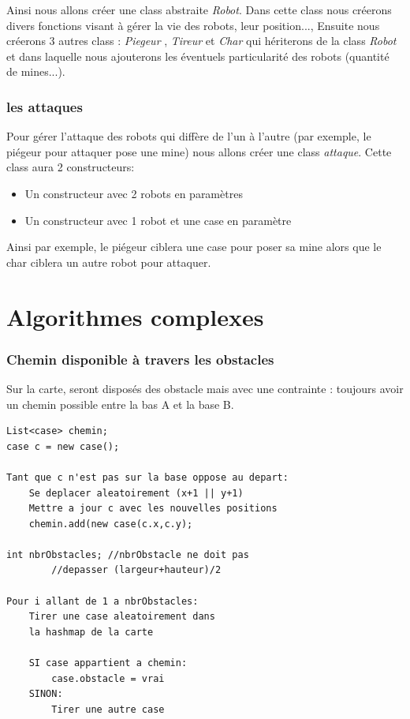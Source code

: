 \documentclass[12pt]{article}
\begin{document}
Ainsi nous allons créer une class abstraite \emph{Robot}. Dans cette class nous créerons divers fonctions visant à gérer la vie des robots, leur position...,
Ensuite nous créerons 3 autres class : \emph{Piegeur} , \emph{Tireur} et \emph{Char} qui hériterons de la class \emph{Robot} et dans laquelle nous ajouterons les éventuels particularité des robots (quantité de mines...).

\section{les attaques}
Pour gérer l'attaque des robots qui diffère de l'un à l'autre (par exemple, le piégeur pour attaquer pose une mine) nous allons créer une class \emph{attaque}.
Cette class aura 2 constructeurs:
\begin{itemize}
\item Un constructeur avec 2 robots en paramètres
\item Un constructeur avec 1 robot et une case en paramètre
\end{itemize}
Ainsi par exemple, le piégeur ciblera une case pour poser sa mine alors que le char ciblera un autre robot pour attaquer.

\newpage
{}
\part*{Algorithmes complexes}
\setcounter{section}{0}

\section{Chemin disponible à travers les obstacles}
Sur la carte, seront disposés des obstacle mais avec une contrainte : toujours avoir un chemin possible entre la bas A et la base B.
\\
\begin{lstlisting}
List<case> chemin;
case c = new case();

Tant que c n'est pas sur la base oppose au depart:
	Se deplacer aleatoirement (x+1 || y+1)
	Mettre a jour c avec les nouvelles positions
	chemin.add(new case(c.x,c.y);

int nbrObstacles; //nbrObstacle ne doit pas 
		//depasser (largeur+hauteur)/2

Pour i allant de 1 a nbrObstacles:
	Tirer une case aleatoirement dans 
	la hashmap de la carte
	
	SI case appartient a chemin:
		case.obstacle = vrai
	SINON:
		Tirer une autre case
		
\end{lstlisting}
\newpage
\end{document}
